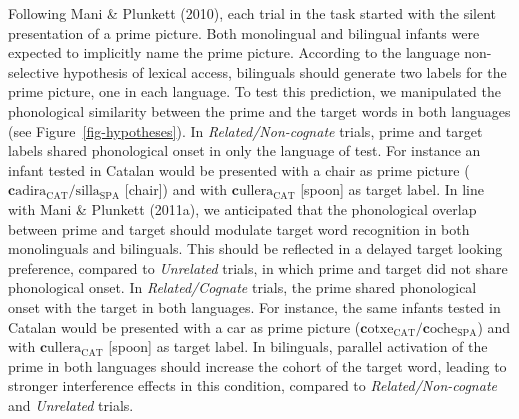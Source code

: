 \documentclass[
  12pt,
  b5paperpaper,
  twoside]{scrreprt}
\begin{document}
Following Mani \& Plunkett (2010), each trial in the task started with
the silent presentation of a prime picture. Both monolingual and
bilingual infants were expected to implicitly name the prime picture.
According to the language non-selective hypothesis of lexical access,
bilinguals should generate two labels for the prime picture, one in each
language. To test this prediction, we manipulated the phonological
similarity between the prime and the target words in both languages (see
Figure~\ref{fig-hypotheses}). In \emph{Related/Non-cognate} trials,
prime and target labels shared phonological onset in only the language
of test. For instance an infant tested in Catalan would be presented
with a chair as prime picture
(\(\textbf{c}\text{adira}_{\text{CAT}}/\text{silla}_{\text{SPA}}\)
{[}chair{]}) and with \(\textbf{c}\text{ullera}_{\text{CAT}}\)
{[}spoon{]} as target label. In line with Mani \& Plunkett (2011a), we
anticipated that the phonological overlap between prime and target
should modulate target word recognition in both monolinguals and
bilinguals. This should be reflected in a delayed target looking
preference, compared to \emph{Unrelated} trials, in which prime and
target did not share phonological onset. In \emph{Related/Cognate}
trials, the prime shared phonological onset with the target in both
languages. For instance, the same infants tested in Catalan would be
presented with a car as prime picture
(\(\textbf{c}\text{otxe}_{\text{CAT}}/\textbf{c}\text{oche}_{\text{SPA}}\))
and with \(\textbf{c}\text{ullera}_{\text{CAT}}\) {[}spoon{]} as target
label. In bilinguals, parallel activation of the prime in both languages
should increase the cohort of the target word, leading to stronger
interference effects in this condition, compared to
\emph{Related/Non-cognate} and \emph{Unrelated} trials.
\end{document}
